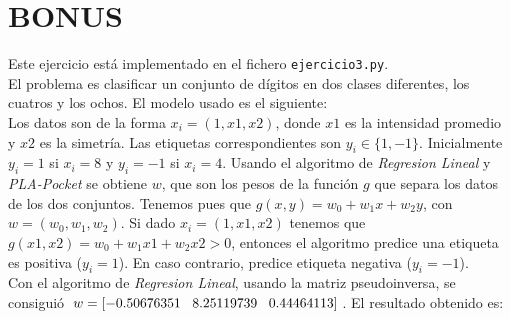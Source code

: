\documentclass{article}
\begin{document}
\begin{figure}[H]
  \centering
\end{figure}

\section{BONUS}

Este ejercicio está implementado en el fichero \texttt{ejercicio3.py}.\\

El problema es clasificar un conjunto de dígitos en dos clases diferentes, los cuatros y los ochos.
El modelo usado es el siguiente:\\
Los datos son de la forma $x_i = (1, x1, x2)$, donde $x1$ es la intensidad promedio y $x2$ es la simetría. Las etiquetas correspondientes son $y_i \in \{1, -1\}$. Inicialmente $y_i = 1$ si $x_i = 8$ y $y_i = -1$ si $x_i = 4$.
Usando el algoritmo de \textit{Regresion Lineal} y \textit{PLA-Pocket} se obtiene $w$, que son los pesos de la función $g$ que separa los datos de los dos conjuntos. Tenemos pues que $g(x,y) = w_0 + w_1x + w_2y$, con $w = (w_0, w_1, w_2)$. Si dado $x_i = (1, x1, x2)$ tenemos que $g(x1, x2) = w_0 + w_1x1 + w_2x2 > 0$, entonces el algoritmo predice una etiqueta es positiva ($y_i = 1$). En caso contrario, predice etiqueta negativa ($y_i = -1$). \\

Con el algoritmo de \textit{Regresion Lineal}, usando la matriz pseudoinversa, se consiguió $w = [-0.50676351 \hspace{3mm} 8.25119739  \hspace{3mm} 0.44464113]$. El resultado obtenido es:
\end{document}
